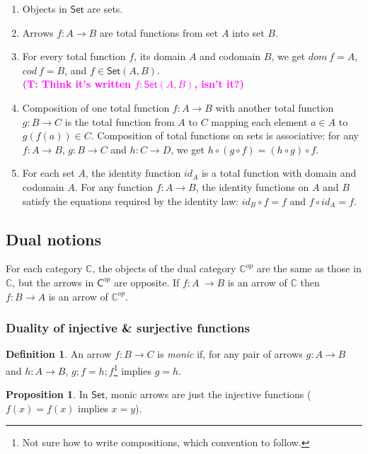 \documentclass{amsart}
\theoremstyle{definition}
\newtheorem{definition}[thm]{Definition}
\newtheorem{proposition}[thm]{Proposition}
\newcommand{\truls}[1]{\textbf{\textcolor{magenta}{(T: #1)}}}
\newcommand{\cat}[1]{\mathsf{#1}} %
\newcommand{\acat}[1]{\mathbb{#1}} %
\renewcommand{\emph}{\textit} %
\begin{document}
\begin{enumerate}
\item Objects in $\cat{Set}$ are sets.
\item Arrows $f: A\to B$ are total functions from set $A$ into set $B$.
\item For every total function $f$, its domain $A$ and codomain $B$, we get
  $dom\ f = A$, $cod\ f = B$, and $f \in \cat{Set}(A, B)$. \\\truls{Think it's written $f : \cat{Set}(A,B)$, isn't it?}
\item Composition of one total function $f: A\to B$ with another total
  function $g: B\to C$ is the total function from $A$ to $C$ mapping
  each element $a \in A$ to $g(f(a))\in C$. Composition of total
  functions on sets is associative: for any $f: A\to B$, $g: B\to C$ and
  $h:C \to D$, we get $h\circ (g\circ f) = (h\circ g)\circ f$.
\item For each set $A$, the identity function $id_A$ is a total function
  with domain and codomain $A$. For any function $f: A\to B$, the
  identity functions on $A$ and $B$ satisfy the equations required by
  the identity law: $id_B \circ f = f$ and $f \circ id_A = f$.
\end{enumerate}

\subsection{Dual notions}

For each category $\acat{C}$, the objects of the dual category $\acat{C}^{op}$ are the same as those in $\acat{C}$, but the arrows in $\cat{C}^{op}$ are opposite. If $f: A~\to B$ is an arrow of $\acat{C}$ then $f: B \to A$ is an arrow of $\acat{C}^{op}$. 

\subsubsection{Duality of injective \& surjective functions}

\begin{definition}
An arrow $f: B \to C$ is \emph{monic} if, for any pair of arrows $g: A\to B$ and $h: A\to B$, $g;\! f = h;\! f$\footnote{Not sure how to write compositions, which convention to follow. } implies $g=h$.
\end{definition}

\begin{proposition}
In $\cat{Set}$, monic arrows are just the injective functions ($f(x) = f(x)$ implies $x=y$). 
\end{proposition}
\end{document}
